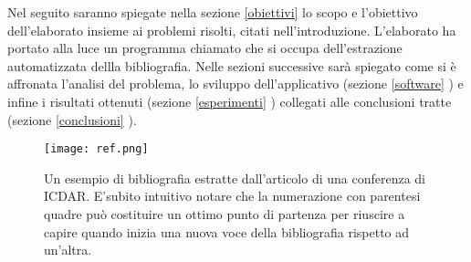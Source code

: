 Nel seguito saranno spiegate nella sezione \ref{obiettivi} lo scopo e l'obiettivo dell'elaborato insieme ai problemi risolti, citati nell'introduzione. L'elaborato ha portato alla luce  un programma chiamato \textit{} che si occupa dell'estrazione automatizzata dellla bibliografia. Nelle sezioni successive sarà spiegato come si è affronata l'analisi del problema, lo sviluppo dell'applicativo (sezione \ref{software} ) e infine i risultati ottenuti (sezione \ref{esperimenti} ) collegati alle conclusioni tratte (sezione \ref{conclusioni} ).


\begin{figure}[htb]
\begin{center}
\texttt{[image: ref.png]}
\end{center}
\caption[Un esempio di bibliografia]{Un esempio di bibliografia estratte dall'articolo di una conferenza di ICDAR. E'subito intuitivo notare che la numerazione con parentesi quadre può costituire un ottimo punto di partenza per riuscire a capire quando inizia una nuova voce della bibliografia rispetto ad un'altra.}
\label{fig:ref-examples}
\end{figure}



